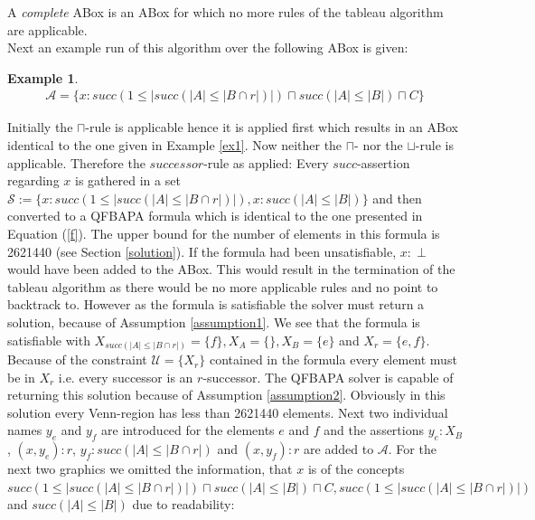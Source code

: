 \documentclass{book}
\theoremstyle{break}
\theoremstyle{definition}
\newtheorem{ex}{Example}
\begin{document}
A \textit{complete} ABox is an ABox for which no more rules of the tableau algorithm are applicable.\\
Next an example run of this algorithm over the following ABox is given:
\begin{ex}
\begin{align*}
\mathcal{A}=\{x:succ(1\leq|succ(|A|\leq|B\cap r|)|)\sqcap succ(|A|\leq |B|)\sqcap C\}
\end{align*}
\end{ex}
Initially the $\sqcap$-rule is applicable hence it is applied first which results in an ABox identical to the one given in Example \ref{ex1}. Now neither the $\sqcap$- nor the $\sqcup$-rule is applicable. Therefore the $successor$-rule as applied: Every $succ$-assertion regarding $x$ is gathered in a set $\mathcal{S}:=\{x:succ(1\leq|succ(|A|\leq|B\cap r|)|), x:succ(|A|\leq |B|)\}$ and then converted to a QFBAPA formula which is identical to the one presented in Equation (\ref{f}). The upper bound for the number of elements in this formula is 2621440 (see Section \ref{solution}). If the formula had been unsatisfiable, $x:\perp$ would have been added to the ABox. This would result in the termination of the tableau algorithm as there would be no more applicable rules and no point to backtrack to. However as the formula is satisfiable the solver must return a solution, because of Assumption \ref{assumption1}. We see that the formula is satisfiable with $X_{succ(|A|\leq |B\cap r|)}=\{f\},X_A=\{\},X_B=\{e\}$ and $X_r=\{e,f\}$. Because of the constraint $\mathcal{U}=\{X_r\}$ contained in the formula every element must be in $X_r$ i.e. every successor is an $r$-successor. The QFBAPA solver is capable of returning this solution because of Assumption \ref{assumption2}. Obviously in this solution every Venn-region has less than 2621440 elements. Next two individual names $y_e$ and $y_f$ are introduced for the elements $e$ and $f$ and the assertions $y_e:X_B$, $(x,y_e):r$, $y_f:succ(|A|\leq|B\cap r|)$ and $(x,y_f):r$ are added to $\mathcal{A}$. For the next two graphics we omitted the information, that $x$ is of the concepts $succ(1\leq|succ(|A|\leq|B\cap r|)|)\sqcap succ(|A|\leq |B|)\sqcap C, succ(1\leq|succ(|A|\leq|B\cap r|)|)$ and $succ(|A|\leq |B|)$ due to readability:
\begin{figure}[H]
\centering
{}
\end{figure}
\end{document}
